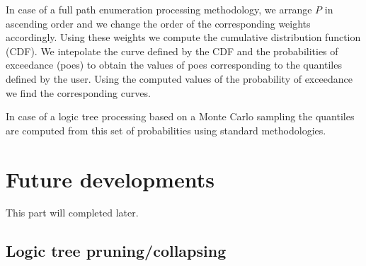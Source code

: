 In case of a full path enumeration processing methodology, we arrange $P$
in ascending order and we change the order of the corresponding 
weights accordingly. Using these weights we compute the cumulative 
distribution function (CDF). 
%
We intepolate the curve defined by the CDF and the probabilities of 
exceedance (poes) to obtain the values of poes corresponding to the 
quantiles defined by the user. 
%
Using the computed values of the probability of exceedance we find 
the corresponding curves.

In case of a logic tree processing based on a Monte Carlo sampling the 
quantiles are computed from this set of probabilities using standard
methodologies.
%
\clearpage
\section{Future developments}
This part will completed later.
%
\subsection{Logic tree pruning/collapsing}

